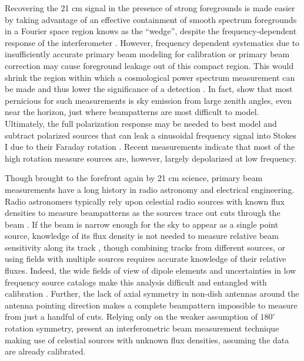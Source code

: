 Recovering the 21 cm signal in the presence of strong foregrounds is made easier by taking advantage of an effective containment of smooth spectrum foregrounds in a Fourier space region knows as the ``wedge'', despite the frequency-dependent response of the interferometer \citep{Dattapowerspec,X13, pober13,MoralesPSShapes, VedanthamWedge, nithya13, CathWedge, AdrianWedge1, AdrianWedge2}. However, frequency dependent systematics due to insufficiently accurate primary beam modeling for calibration or primary beam correction may cause foreground leakage out of this compact region. This would shrink the region within which a cosmological power spectrum measurement can be made and thus lower the significance of a detection \citep{PoberNextGen}. In fact, \citet{nithya15,nithya15b} show that most pernicious for such measurements is sky emission from large zenith angles, even near the horizon, just where beampatterns are most difficult to model. Ultimately, the full polarization response may be needed to best model and subtract polarized sources that can leak a sinusoidal frequency signal into Stokes I due to their Faraday rotation \citep{jelic2010,moore13}. Recent measurements \citep{bernardi13, moore13,moore15,asad15} indicate that most of the high rotation measure sources are, however, largely depolarized at low frequency.%

Though brought to the forefront again by 21 cm science, primary beam measurements have a long history in radio astronomy and electrical engineering. Radio astronomers typically rely upon celestial radio sources with known flux densities to measure beampatterns as the sources trace out cuts through the beam \citep[e.g.,][]{nithyaVLA}. If the beam is narrow enough for the sky to appear as a single point source, knowledge of its flux density is not needed to measure relative beam sensitivity along its track \citep[e.g.][]{aavs}, though combining tracks from different sources, or using fields with multiple sources requires accurate knowledge of their relative fluxes. Indeed, the wide fields of view of dipole elements and uncertainties in low frequency source catalogs make this analysis difficult and entangled with calibration \citep{jacobs2013}. Further, the lack of axial symmetry in non-dish antennas around the antenna pointing direction makes a complete beampattern impossible to measure from just a handful of cuts. Relying only on the weaker assumption of $180^\circ$ rotation symmetry, \citet{pober12} present an interferometric beam measurement technique making use of celestial sources with unknown flux densities, assuming the data are already calibrated.  

